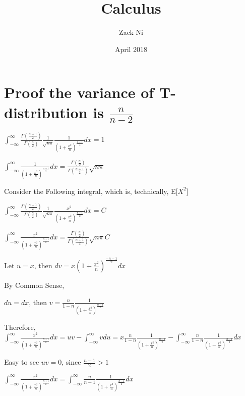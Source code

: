 \documentclass[20pt]{article}
\title{Calculus}
\author{Zack Ni }
\date{April 2018}
\begin{document}
\maketitle

\section{Proof the variance of T-distribution is $\frac{n}{n-2}$}

{\fontsize{20}{20}\selectfont 
$\int_{-\infty}^{\infty}{ \frac{\Gamma({\frac{n+1}{2}})}{\Gamma({\frac{n}{2}})} \frac{1}{\sqrt{n\pi}} \frac{1}{(1+\frac{x^2}{n})^{\frac{n+1}{2}}}}dx = 1$ }

{\fontsize{20}{20}\selectfont 
$\int_{-\infty}^{\infty}{  \frac{1}{(1+\frac{x^2}{n})^{\frac{n+1}{2}}}}dx = \frac{\Gamma({\frac{n}{2}})}{\Gamma({\frac{n+1}{2}})}  \sqrt{n\pi} $ }

{\fontsize{10}{10}\selectfont Consider the Following integral, which is, technically, E[$X^2$]}


{\fontsize{20}{20}\selectfont 
$\int_{-\infty}^{\infty}{ \frac{\Gamma({\frac{n+1}{2}})}{\Gamma({\frac{n}{2}})} \frac{1}{\sqrt{n\pi}} \frac{x^2}{(1+\frac{x^2}{n})^{\frac{n+1}{2}}}}dx = C$ }

{\fontsize{20}{20}\selectfont 
$\int_{-\infty}^{\infty}{  \frac{x^2}{(1+\frac{x^2}{n})^{\frac{n+1}{2}}}}dx = \frac{\Gamma({\frac{n}{2}})}{\Gamma({\frac{n+1}{2}})}  \sqrt{n\pi} C $ }

{\fontsize{20}{20}\selectfont 
 Let $u = x$, then $dv = x (1+\frac{x^2}{n})^{\frac{-n-1}{2}} dx $ }
 
{\fontsize{10}{10}\selectfont By Common Sense,}

 {\fontsize{20}{20}\selectfont 
  $du = dx$, then $v = \frac{n}{1-n} \frac{1}{(1+\frac{x^2}{n})^{\frac{n-1}{2}}} $ }


{\fontsize{10}{10}\selectfont Therefore,}
{\fontsize{20}{20}\selectfont 
$\int_{-\infty}^{\infty}{  \frac{x^2}{(1+\frac{x^2}{n})^{\frac{n+1}{2}}}}dx = uv - \int_{-\infty}^{\infty} v du = x\frac{n}{1-n} \frac{1}{(1+\frac{x^2}{n})^{\frac{n-1}{2}}} - \int_{-\infty}^{\infty} \frac{n}{1-n} \frac{1}{(1+\frac{x^2}{n})^{\frac{n-1}{2}}}dx$}

{\fontsize{10}{10}\selectfont Easy to see $uv=0$, since $\frac{n-1}{2} > 1$}

{\fontsize{20}{20}\selectfont 
$\int_{-\infty}^{\infty}{  \frac{x^2}{(1+\frac{x^2}{n})^{\frac{n+1}{2}}}}dx = \int_{-\infty}^{\infty} \frac{n}{n-1} \frac{1}{(1+\frac{x^2}{n})^{\frac{n-1}{2}}}dx$}
\end{document}
